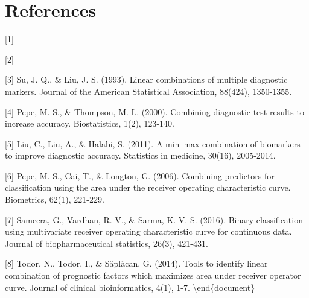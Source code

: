 \documentclass[]{article}
\begin{document}
\hypertarget{references}{%
\section*{References}\label{references}}

{[}1{]}

{[}2{]}

{[}3{]} Su, J. Q., \& Liu, J. S. (1993). Linear combinations of multiple diagnostic markers. Journal of the American Statistical Association, 88(424), 1350-1355.

{[}4{]} Pepe, M. S., \& Thompson, M. L. (2000). Combining diagnostic test results to increase accuracy. Biostatistics, 1(2), 123-140.

{[}5{]} Liu, C., Liu, A., \& Halabi, S. (2011). A min--max combination of biomarkers to improve diagnostic accuracy. Statistics in medicine, 30(16), 2005-2014.

{[}6{]} Pepe, M. S., Cai, T., \& Longton, G. (2006). Combining predictors for classification using the area under the receiver operating characteristic curve. Biometrics, 62(1), 221-229.

{[}7{]} Sameera, G., Vardhan, R. V., \& Sarma, K. V. S. (2016). Binary classification using multivariate receiver operating characteristic curve for continuous data. Journal of biopharmaceutical statistics, 26(3), 421-431.

{[}8{]} Todor, N., Todor, I., \& Săplăcan, G. (2014). Tools to identify linear combination of prognostic factors which maximizes area under receiver operator curve. Journal of clinical bioinformatics, 4(1), 1-7.
\textbackslash end\{document\}
\end{document}
